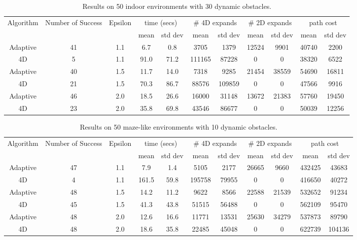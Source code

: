 \begin{table}[t]
\scriptsize
\centering

\begin{tabular}{|c|c|c|c c|c c|c c|c c|}
\hline
Algorithm & Number of Success & Epsilon & \multicolumn{2}{|c|}{time (secs)} & \multicolumn{2}{|c|}{\# 4D expands} & \multicolumn{2}{|c|}{\# 2D expands} & \multicolumn{2}{|c|}{path cost} \\ 
 & & & mean & std dev & mean & std dev & mean & std dev & mean  & std dev \\ \hline\hline
Adaptive & 41 & 1.1 & 6.7 & 0.8 & 3705 & 1379 & 12524 & 9901 & 40740 & 2200 \\
\hline
4D & 5 & 1.1 & 91.0 & 71.2 & 111165 & 87228 & 0 & 0 & 38320 & 6522 \\
\hline\hline
Adaptive & 40 & 1.5 & 11.7 & 14.0 & 7318 & 9285 & 21454 & 38559 & 54690 & 16811 \\
\hline
4D & 21 & 1.5 & 70.3 & 86.7 & 88576 & 109859 & 0 & 0 & 47566 & 9916 \\
\hline\hline
Adaptive & 46 & 2.0 & 18.5 & 26.6 & 16000 & 31148 & 13672 & 21383 & 57760 & 19450 \\
\hline
4D & 23 & 2.0 & 35.8 & 69.8 & 43546 & 86677 & 0 & 0 & 50039 & 12256 \\
\hline
\end{tabular}

\caption{Results on 50 indoor environments with 30 dynamic obstacles.}
\label{tab:ppad-indoor-30}
\end{table}

\begin{table}[t]
\scriptsize
\centering

\begin{tabular}{|c|c|c|c c|c c|c c|c c|}
\hline
Algorithm & Number of Success & Epsilon & \multicolumn{2}{|c|}{time (secs)} & \multicolumn{2}{|c|}{\# 4D expands} & \multicolumn{2}{|c|}{\# 2D expands} & \multicolumn{2}{|c|}{path cost} \\ 
 & & & mean & std dev & mean & std dev & mean & std dev & mean  & std dev \\ \hline\hline
Adaptive & 47 & 1.1 & 7.9 & 1.4 & 5105 & 2177 & 26665 & 9660 & 432425 & 43683 \\
\hline
4D & 4 & 1.1 & 161.5 & 59.8 & 195758 & 79955 & 0 & 0 & 416650 & 40272 \\
\hline\hline
Adaptive & 48 & 1.5 & 14.2 & 11.2 & 9622 & 8566 & 22588 & 21539 & 532652 & 91234 \\
\hline
4D & 45 & 1.5 & 41.3 & 43.8 & 51515 & 56488 & 0 & 0 & 562109 & 95470 \\
\hline\hline
Adaptive & 48 & 2.0 & 12.6 & 16.6 & 11771 & 13531 & 25630 & 34279 & 537873 & 89790 \\
\hline
4D & 48 & 2.0 & 18.6 & 35.8 & 22485 & 45048 & 0 & 0 & 622739 & 104136 \\
\hline
\end{tabular}

\caption{Results on 50 maze-like environments with 10 dynamic obstacles.}
\label{tab:ppad-maze-10}
\end{table}

